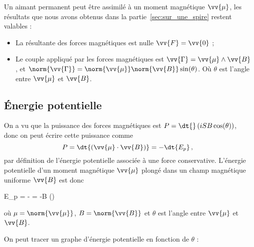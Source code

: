 \documentclass{cours}
\begin{document}
Un aimant permanent peut être assimilé à un moment magnétique $\vv{\mu}$, les résultats que nous avons obtenus dans la partie~\ref{sec:sur_une_spire} restent valables :
\begin{itemize}
  \item La résultante des forces magnétiques est nulle $\vv{F}=\vv{0}$ ;
  \item Le couple appliqué par les forces magnétiques est $\vv{\Gamma}=\vv{\mu}\wedge \vv{B}$, et $\norm{\vv{\Gamma}} = \norm{\vv{\mu}} \norm{\vv{B}} \sin(\theta)$. Où $\theta$ est l'angle entre $\vv{\mu}$ et $\vv{B}$.    
\end{itemize}
\begin{center}
\end{center}
\subsection{Énergie potentielle}%
\label{sub:energie_potentielle}

On a vu que la puissance des forces magnétiques est $P=\dt{}\left(iSB\cos(\theta)\right)$, donc on peut écrire cette puissance comme
\begin{equation}
  P = \dt{\left(\vv{\mu}\cdot \vv{B}\right) } = -  \dt{E_p}\, , 
\end{equation}
par définition de l'énergie potentielle associée à une force conservative. L'énergie potentielle d'un moment magnétique $\vv{\mu}$ plongé dans un champ magnétique uniforme $\vv{B}$ est donc 
\begin{eqencadre}
  E_p = -\vv{\mu}\cdot{} = -\mu B \cos(\theta)
\end{eqencadre}
où $\mu=\norm{\vv{\mu}}$, $B=\norm{\vv{B}}$ et $\theta$ est l'angle entre $\vv{\mu}$ et $\vv{B}$.    

On peut tracer un graphe d'énergie potentielle en fonction de $\theta$ :
\end{document}
